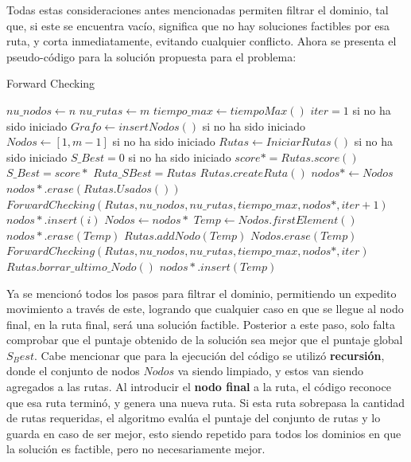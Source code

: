 \documentclass[letter, 10pt]{article}
\begin{document}
Todas estas consideraciones antes mencionadas permiten filtrar el dominio, tal que, si este se encuentra vacío, significa que no hay soluciones factibles por esa ruta, y corta inmediatamente, evitando cualquier conflicto. Ahora se presenta el pseudo-código para la solución propuesta para el problema:

\begin{algorithm}
\caption{Forward Checking}\label{euclid}

\begin{algorithmic}[1]

    \State $nu\_nodos \gets n$
    \State $nu\_rutas \gets m$
    \State $tiempo\_max \gets tiempoMax()$
    \State $iter = 1$ si no ha sido iniciado
    \State $Grafo \gets insertNodos()$ si no ha sido iniciado
    \State $Nodos \gets [1, m-1]$ si no ha sido iniciado
    \State $Rutas \gets IniciarRutas()$ si no ha sido iniciado
    \State $S\_Best = 0$ si no ha sido iniciado
        \State $score* = Rutas.score()$
            \State $S\_Best = score*$
            \State $Ruta\_SBest = Rutas$
        \EndIf
        \State $Rutas.createRuta()$
        \State $nodos* \gets Nodos$
        \State $nodos*.erase(Rutas.Usados())$
        \State $ForwardChecking(Rutas, nu\_nodos, nu\_rutas, tiempo\_max, nodos*, iter+1)$
    \Else
            \State $nodos*.insert(i)$
        \EndIf
        \EndFor
        \State $Nodos \gets nodos*$
            \State $Temp \gets Nodos.firstElement()$
            \State $nodos*.erase(Temp)$
            \State $Rutas.addNodo( Temp )$
            \State $Nodos.erase( Temp )$
            \State $ForwardChecking(Rutas, nu\_nodos, nu\_rutas, tiempo\_max, nodos*, iter)$
            \State $Rutas.borrar\_ultimo\_Nodo()$
            \State $nodos*.insert( Temp )$
        \EndWhile
    \EndIf
\end{algorithmic}
\end{algorithm}
\newpage
Ya se mencionó todos los pasos para filtrar el dominio, permitiendo un expedito movimiento a través de este, logrando que cualquier caso en que se llegue al nodo final, en la ruta final, será una solución factible. Posterior a este paso, solo falta comprobar que el puntaje obtenido de la solución sea mejor que el puntaje global $S_Best$. Cabe mencionar que para la ejecución del código se utilizó \textbf{recursión}, donde el conjunto de nodos $Nodos$ va siendo limpiado, y estos van siendo agregados a las rutas. Al introducir el \textbf{nodo final} a la ruta, el código reconoce que esa ruta terminó, y genera una nueva ruta. Si esta ruta sobrepasa la cantidad de rutas requeridas, el algoritmo evalúa el puntaje del conjunto de rutas y lo guarda en caso de ser mejor, esto siendo repetido para todos los dominios en que la solución es factible, pero no necesariamente mejor.
\end{document}
